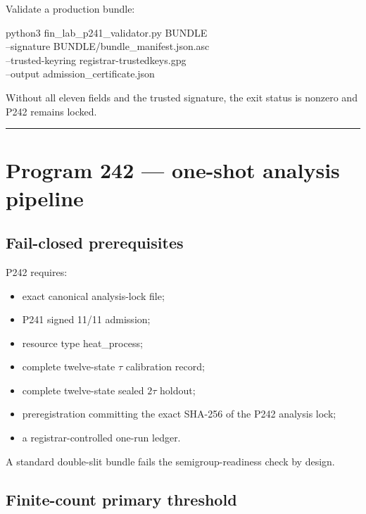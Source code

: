 \documentclass[11pt,a4paper,openany]{report}
\begin{document}
Validate a production bundle:

python3 fin\_lab\_p241\_validator.py BUNDLE \\
--signature BUNDLE/\allowbreak{}bundle\_manifest.json.asc \\
--trusted-keyring registrar-trustedkeys.gpg \\
--output admission\_certificate.json

Without all eleven fields and the trusted signature, the exit status is nonzero and P242 remains locked.

\par\medskip\hrule\medskip

\chapter{Program 242 --- one-shot analysis pipeline}

\section{Fail-closed prerequisites}

P242 requires:

\begin{itemize}
\item 
exact canonical analysis-lock file;

\item 
P241 signed 11/\allowbreak{}11 admission;

\item 
resource type heat\_process;

\item 
complete twelve-state \(\tau\) calibration record;

\item 
complete twelve-state sealed \(2\tau\) holdout;

\item 
preregistration committing the exact SHA-256 of the P242 analysis lock;

\item 
a registrar-controlled one-run ledger.

\end{itemize}

A standard double-slit bundle fails the semigroup-readiness check by design.

\section{Finite-count primary threshold}
\end{document}
